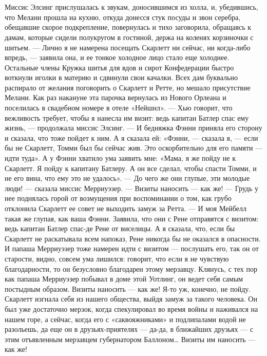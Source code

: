 \chapter{\ }

Миссис Элсинг прислушалась к звукам, доносившимся из холла, и, убедившись, что Мелани прошла на кухню, откуда донесся стук посуды и звон серебра, обещавшие скорое подкрепление, повернулась и тихо заговорила, обращаясь к дамам, которые сидели полукругом в гостиной, держа на коленях корзиночки с шитьем.
— Лично я не намерена посещать Скарлетт ни сейчас, ни когда-либо впредь, — заявила она, и ее тонкое холодное лицо стало еще холоднее.
Остальные члены Кружка шитья для вдов и сирот Конфедерации быстро воткнули иголки в материю и сдвинули свои качалки. Всех дам буквально распирало от желания поговорить о Скарлетт и Ретте, но мешало присутствие Мелани. Как раз накануне эта парочка вернулась из Нового Орлеана и поселилась в свадебном номере в отеле «Нейшнл».
— Хью говорит, что вежливость требует, чтобы я нанесла им визит: ведь капитан Батлер спас ему жизнь, — продолжала миссис Элсинг. — И бедняжка Фэнни приняла его сторону и сказала, что тоже пойдет к ним. А я сказала ей: «Фэнни, — сказала я, — если бы не Скарлетт, Томми был бы сейчас жив. Это оскорбительно для его памяти — идти туда». А у Фэнни хватило ума заявить мне: «Мама, я же пойду не к Скарлетт. Я пойду к капитану Батлеру. А он все сделал, чтобы спасти Томми, и не его вина, что ему это не удалось».
— До чего же они глупые, эти молодые люди! — сказала миссис Мерриуэзер. — Визиты наносить — как же! — Грудь у нее поднялась горой от возмущения при воспоминании о том, как грубо отклонила Скарлетт ее совет не выходить замуж за Ретта. — И моя Мейбелл такая же глупая, как ваша Фэнни. Заявила, что они с Рене отправятся с визитом: ведь капитан Батлер спас-де Рене от виселицы. А я сказала, что, если бы Скарлетт не раскатывала всем напоказ, Рене никогда бы не оказался в опасности. И папаша Мерриуэзер тоже намерен идти с визитом — послушать его, так он от старости, видно, совсем ума лишился: говорит, что если я не чувствую благодарности, то он безусловно благодарен этому мерзавцу. Клянусь, с тех пор как папаша Мерриуэзер побывал в доме этой Уотлинг, он ведет себя самым постыдным образом. Визиты наносить — как же! Я-то уж, конечно, не пойду. Скарлетт изгнала себя из нашего общества, выйдя замуж за такого человека. Он был уже достаточно мерзок, когда спекулировал во время войны и наживался на нашем горе, а сейчас, когда его с «саквояжниками» и подлипалами водой не разольешь, да еще он в друзьях-приятелях — да-да, в ближайших друзьях — с этим отъявленным мерзавцем губернатором Баллоном… Визиты им наносить — как же!
